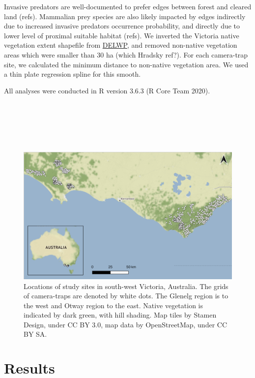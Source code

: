 \documentclass[11pt,a4paper,titlepage,twoside,openright]{style/unimelbthesis}
\begin{document}
\begin{mainmatter}
Invasive predators are well-documented to prefer edges between forest and cleared land (refs). Mammalian prey species are also likely impacted by edges indirectly due to increased invasive predators occurrence probability, and directly due to lower level of proximal suitable habitat (refs). We inverted the Victoria native vegetation extent shapefile from \href{\%22https://discover.data.vic.gov.au/dataset/native-vegetation-modelled-2005-ecological-vegetation-classes-with-bioregional-conservation-sta\%22}{DELWP}, and removed non-native vegetation areas which were smaller than 30 ha (which Hradsky ref?). For each camera-trap site, we calculated the minimum distance to non-native vegetation area. We used a thin plate regression spline for this smooth.

All analyses were conducted in R version 3.6.3 (R Core Team 2020).

\newpage

\(~\)

\(~\)

\(~\)
\begin{figure}

{\centering \includegraphics[width=1\linewidth]{figure/c1/fig1_map} 

}

\caption{Locations of study sites in south-west Victoria, Australia. The grids of camera-traps are denoted by white dots. The Glenelg region is to the west and Otway region to the east. Native vegetation is indicated by dark green, with hill shading. Map tiles by Stamen Design, under CC BY 3.0, map data by OpenStreetMap, under CC BY SA.}\label{fig:occ-map}
\end{figure}
\newpage

\hypertarget{results}{%
\section{Results}\label{results}}


\end{mainmatter}
\end{document}
